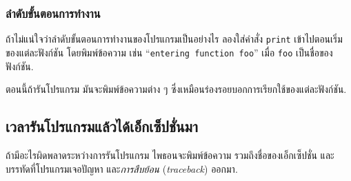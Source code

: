 \subsubsection{ลำดับขั้นตอนการทำงาน}



ถ้าไม่แน่ใจว่าลำดับขั้นตอนการทำงานของโปรแกรมเป็นอย่างไร
ลองใส่คำสั่ง \texttt{print} เข้าไปตอนเริ่มของแต่ละฟังก์ชัน โดยพิมพ์ข้อความ เช่น
``\texttt{entering function foo}'' เมื่อ \texttt{foo} เป็นชื่อของฟังก์ชัน.

ตอนนี้ถ้ารันโปรแกรม
มันจะพิมพ์ข้อความต่าง ๆ ซึ่งเหมือนร่องรอยบอกการเรียกใช้ของแต่ละฟังก์ชัน.

\subsection{เวลารันโปรแกรมแล้วได้เอ็กเซ็ปชั่นมา}


ถ้ามีอะไรผิดพลาดระหว่างการรันโปรแกรม
ไพธอนจะพิมพ์ข้อความ รวมถึงชื่อของเอ็กเซ็ปชั่น
และบรรทัดที่โปรแกรมเจอปัญหา และ\textit{การสืบย้อน} (\textit{traceback})
ออกมา.


